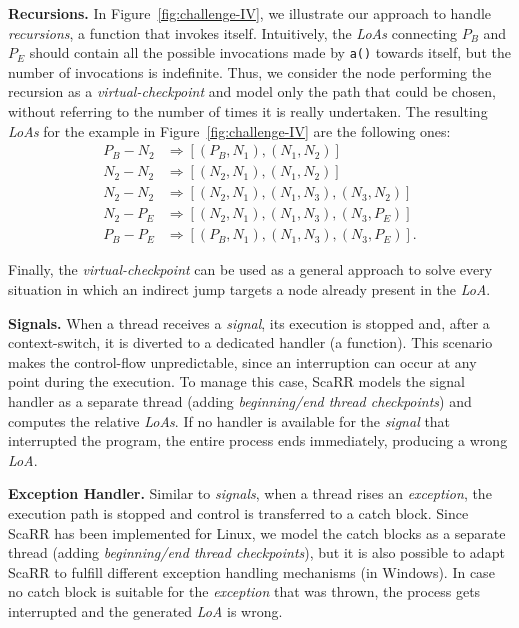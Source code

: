 \textbf{Recursions.}
In Figure~\ref{fig:challenge-IV}, we illustrate our approach to handle 
\emph{recursions},
\ie a function that invokes itself. 
%
Intuitively, the \emph{LoAs} connecting \texttt{$P_B$} and \texttt{$P_E$} 
should contain all the possible invocations made by \texttt{a()} towards 
itself, but the number of invocations is indefinite. Thus, we consider the node 
performing the recursion as a \emph{virtual-checkpoint} and model only the path 
that could be chosen, without referring to the number of times it is really 
undertaken. The resulting \emph{LoAs} for the example in 
Figure~\ref{fig:challenge-IV} are the following ones: 
\begin{equation*}
\begin{split}
P_B-N_2 &\Rightarrow [(P_B, N_1),(N_1,N_2)] \\    
N_2-N_2 &\Rightarrow [(N_2, N_1),(N_1,N_2)] \\ 
N_2-N_2 &\Rightarrow [(N_2, N_1),(N_1, N_3),(N_3, N_2)] \\
N_2-P_E &\Rightarrow [(N_2, N_1),(N_1, N_3),(N_3, P_E)] \\
P_B-P_E &\Rightarrow [(P_B, N_1),(N_1, N_3),(N_3, P_E)].
\end{split}
\end{equation*}

Finally, the \emph{virtual-checkpoint} can be used as a general approach to 
solve every situation in which an indirect jump targets a node already present 
in the \emph{LoA}.

\textbf{Signals.}
When a thread receives a \emph{signal}, its execution is stopped and, after a 
context-switch, it is diverted to a dedicated handler (\eg a function).
This scenario makes the control-flow unpredictable, since an interruption can 
occur at any point during the execution. To manage this case, ScaRR models the 
signal handler as a separate thread (adding \emph{beginning/end thread 
checkpoints})
and computes the relative \emph{LoAs}. If no handler is available for the 
\emph{signal} that interrupted the program, the entire process ends 
immediately, producing a wrong \emph{LoA}. 

\textbf{Exception Handler.}
Similar to \emph{signals}, when a thread rises an \emph{exception}, the 
execution path is stopped
and control is transferred to a catch block. 
Since ScaRR has been implemented for Linux,
we model the catch blocks as a separate thread (adding \emph{beginning/end 
thread checkpoints}),
but it is also possible to adapt ScaRR to fulfill different exception handling 
mechanisms (\eg in Windows).
In case no catch block is suitable for the \emph{exception} that was thrown, 
the process gets interrupted and the generated \emph{LoA} is wrong.


